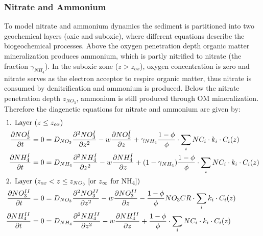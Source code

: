 \documentclass[gmd, manuscript]{copernicus}
\begin{document}
\subsubsection{Nitrate and Ammonium}
To model nitrate and ammonium dynamics the sediment is partitioned into two geochemical layers (oxic and suboxic), where different equations describe the biogeochemical processes. 
Above the oxygen penetration depth organic matter mineralization produces ammonium, which is partly nitrified to nitrate (the fraction $\gamma_{NH_4}$). 
In the suboxic zone ($z>z_{ox}$), oxygen concentration is zero and nitrate serves as the electron acceptor to respire organic matter, thus nitrate is consumed by denitrification and ammonium is produced. Below the nitrate 
penetration depth $z_{NO_3}$, ammonium is still produced through OM mineralization. Therefore the diagenetic equations for nitrate and ammonium are given by:
\begin{align}
\intertext{1. Layer ($z \leq z_{ox}$)}
 \frac{\partial NO_3^I}{\partial t} &= 0 = D_{NO_3} \frac{\partial^2NO_3^I }{\partial z^2} - w\frac{\partial NO_3^I }{\partial z} + \gamma_{NH_4} \frac{1-\phi}{\phi} \cdot \sum_i NC_i \cdot k_i \cdot C_{i}(z)\label{eq:NO3_ODE1_L1}\\ %
 \frac{\partial NH_4^I}{\partial t} &= 0 = D_{NH_4} \frac{\partial^2NH_4^I }{\partial z^2} - w\frac{\partial NH_4^I }{\partial z} + (1-\gamma_{NH_4}) \frac{1-\phi}{\phi} \cdot \sum_i NC_i \cdot k_i \cdot C_{i}(z)\label{eq:NH4_ODE1_L1}\\
 \intertext{2. Layer ($z_{ox} < z \leq z_{NO_3}$ [or $z_\infty$ for NH$_4$])} 
\frac{\partial NO_3^{II}}{\partial t} &= 0 = D_{NO_3} \frac{\partial^2NO_3^{II} }{\partial z^2} - w\frac{\partial NO_3^{II} }{\partial z} - \frac{1-\phi}{\phi} NO_3CR \cdot \sum_i k_i \cdot C_{i}(z) \label{eq:NO3_ODE1_L2}\\
\frac{\partial NH_4^{II}}{\partial t} &= 0 = D_{NH_4} \frac{\partial^2NH_4^{II} }{\partial z^2} - w\frac{\partial NH_4^{II} }{\partial z} + \frac{1-\phi}{\phi} \cdot \sum_i NC_i \cdot k_i \cdot C_{i}(z)\label{eq:NH4_ODE1_L2}
\end{align}
\end{document}
